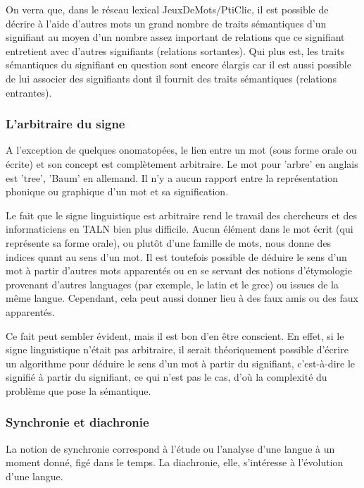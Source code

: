 \documentclass[a4paper,11pt,french]{article}
\begin{document}
On verra que, dans le réseau lexical JeuxDeMots/PtiClic, il est possible de décrire à l'aide d'autres mots un grand nombre de traits sémantiques d'un signifiant au moyen d'un nombre assez important de relations que ce signifiant entretient avec d'autres signifiants (relations sortantes). Qui plus est, les traits sémantiques du signifiant en question sont encore élargis car il est aussi possible de lui associer des signifiants dont il fournit des traits sémantiques (relations entrantes). 

\subsubsection{L'arbitraire du signe}

A l'exception de quelques onomatopées, le lien entre un mot (sous forme orale ou écrite) et son concept est complètement arbitraire. Le mot pour 'arbre' en anglais est 'tree', 'Baum' en allemand. Il n'y a aucun rapport entre la représentation phonique ou graphique d'un mot et sa signification.

Le fait que le signe linguistique est arbitraire rend le travail des chercheurs et des informaticiens en TALN bien plus difficile. Aucun élément dans le mot écrit (qui représente sa forme orale), ou plutôt d'une famille de mots, nous donne des indices quant au sens d'un mot. Il est toutefois possible de déduire le sens d'un mot à partir d'autres mots apparentés ou en se servant des notions d'étymologie provenant d'autres languages (par exemple, le latin et le grec) ou issues de la même langue. Cependant, cela peut aussi donner lieu à des faux amis ou des faux apparentés. 

Ce fait peut sembler évident, mais il est bon d'en être conscient. En effet, si le signe linguistique n'était pas arbitraire, il serait théoriquement possible d'écrire un algorithme pour déduire le sens d'un mot à partir du signifiant, c'est-à-dire le signifié à partir du signifiant, ce qui n'est pas le cas, d'où la complexité du problème que pose la sémantique. 


\subsubsection{Synchronie et diachronie}

La notion de synchronie correspond à l'étude ou l'analyse d'une langue à un moment donné, figé dans le temps. La diachronie, elle, s'intéresse à l'évolution d'une langue.
\end{document}
